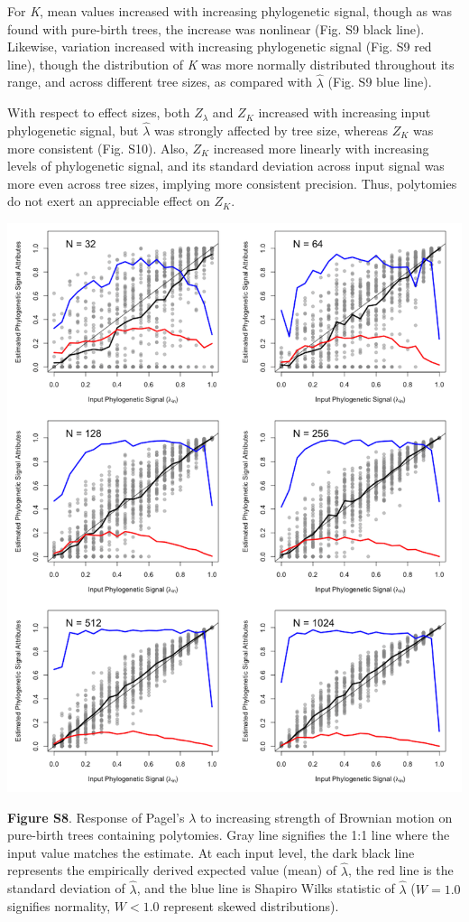 \documentclass[
]{article}
\begin{document}
For \emph{K}, mean values increased with increasing phylogenetic signal,
though as was found with pure-birth trees, the increase was nonlinear
(Fig. S9 black line). Likewise, variation increased with increasing
phylogenetic signal (Fig. S9 red line), though the distribution of
\emph{K} was more normally distributed throughout its range, and across
different tree sizes, as compared with \(\hat{\lambda}\) (Fig. S9 blue
line). \hfill\break

With respect to effect sizes, both \(Z_{\lambda}\) and \(Z_K\) increased
with increasing input phylogenetic signal, but \(\hat{\lambda}\) was
strongly affected by tree size, whereas \(Z_K\) was more consistent
(Fig. S10). Also, \(Z_K\) increased more linearly with increasing levels
of phylogenetic signal, and its standard deviation across input signal
was more even across tree sizes, implying more consistent precision.
Thus, polytomies do not exert an appreciable effect on \(Z_K\).

\includegraphics[width=0.95\linewidth]{fig.S8}

\textbf{Figure S8}. Response of Pagel's \(\lambda\) to increasing
strength of Brownian motion on pure-birth trees containing polytomies.
Gray line signifies the 1:1 line where the input value matches the
estimate. At each input level, the dark black line represents the
empirically derived expected value (mean) of \(\hat\lambda\), the red
line is the standard deviation of \(\hat\lambda\), and the blue line is
Shapiro Wilks statistic of \(\hat\lambda\) (\(W=1.0\) signifies
normality, \(W< 1.0\) represent skewed distributions).
\end{document}
